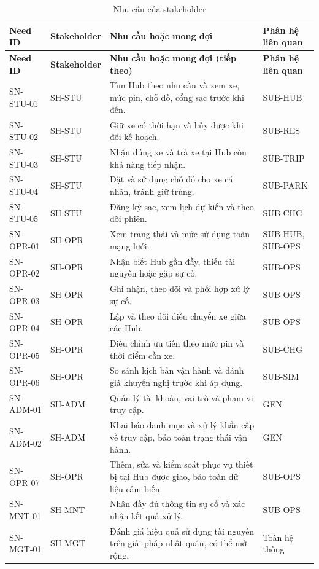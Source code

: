 \begingroup
\small
\begin{longtable}{|L{23mm}|L{27mm}|L{65mm}|L{24mm}|}
  \caption{Nhu cầu của stakeholder}\label{tab:stakeholder-needs}\\
  \hline
  \textbf{Need ID} & \textbf{Stakeholder} & \centering\arraybackslash\textbf{Nhu cầu hoặc mong đợi} & \textbf{Phân hệ liên quan}\\
  \hline
  \endfirsthead
  \hline
  \textbf{Need ID} & \textbf{Stakeholder} & \centering\arraybackslash\textbf{Nhu cầu hoặc mong đợi (tiếp theo)} & \textbf{Phân hệ liên quan}\\
  \hline
  \endhead
  SN-STU-01 & SH-STU & Tìm Hub theo nhu cầu và xem xe, mức pin, chỗ đỗ, cổng sạc trước khi đến. & SUB-HUB\\
  \hline
  SN-STU-02 & SH-STU & Giữ xe có thời hạn và hủy được khi đổi kế hoạch. & SUB-RES\\
  \hline
  SN-STU-03 & SH-STU & Nhận đúng xe và trả xe tại Hub còn khả năng tiếp nhận. & SUB-TRIP\\
  \hline
  SN-STU-04 & SH-STU & Đặt và sử dụng chỗ đỗ cho xe cá nhân, tránh giữ trùng. & SUB-PARK\\
  \hline
  SN-STU-05 & SH-STU & Đăng ký sạc, xem lịch dự kiến và theo dõi phiên. & SUB-CHG\\
  \hline
  SN-OPR-01 & SH-OPR & Xem trạng thái và mức sử dụng toàn mạng lưới. & SUB-HUB, SUB-OPS\\
  \hline
  SN-OPR-02 & SH-OPR & Nhận biết Hub gần đầy, thiếu tài nguyên hoặc gặp sự cố. & SUB-OPS\\
  \hline
  SN-OPR-03 & SH-OPR & Ghi nhận, theo dõi và phối hợp xử lý sự cố. & SUB-OPS\\
  \hline
  SN-OPR-04 & SH-OPR & Lập và theo dõi điều chuyển xe giữa các Hub. & SUB-OPS\\
  \hline
  SN-OPR-05 & SH-OPR & Điều chỉnh ưu tiên theo mức pin và thời điểm cần xe. & SUB-CHG\\
  \hline
  SN-OPR-06 & SH-OPR & So sánh kịch bản vận hành và đánh giá khuyến nghị trước khi áp dụng. & SUB-SIM\\
  \hline
  SN-ADM-01 & SH-ADM & Quản lý tài khoản, vai trò và phạm vi truy cập. & GEN\\
  \hline
  SN-ADM-02 & SH-ADM & Khai báo danh mục và xử lý khẩn cấp về truy cập, bảo toàn trạng thái vận hành. & GEN\\
  \hline
  SN-OPR-07 & SH-OPR & Thêm, sửa và kiểm soát phục vụ thiết bị tại Hub được giao, bảo toàn dữ liệu cảm biến. & SUB-OPS\\
  \hline
  SN-MNT-01 & SH-MNT & Nhận đầy đủ thông tin sự cố và xác nhận kết quả xử lý. & SUB-OPS\\
  \hline
  SN-MGT-01 & SH-MGT & Đánh giá hiệu quả sử dụng tài nguyên trên giải pháp nhất quán, có thể mở rộng. & Toàn hệ thống\\
  \hline
\end{longtable}
\endgroup

